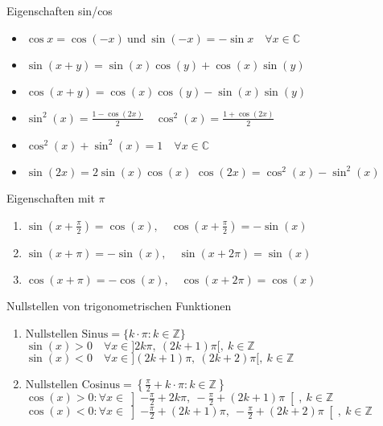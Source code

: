 \begin{theorem}{Eigenschaften sin/cos}
    \begin{itemize}
        \item $\cos x = \cos(-x) ~\text{und}~ \sin(-x) = -\sin x \quad\forall x \in \mathbb{C}$
        \item $\sin(x + y) = \sin(x)\cos(y) + \cos(x)\sin(y)$
        \item $\cos(x + y) = \cos(x)\cos(y) - \sin(x)\sin(y)$
        \item $\sin^2(x) = \frac{1 - \cos(2x)}{2} \quad \cos^2(x) = \frac{1 + \cos(2x)}{2}$
        \item $\cos^2(x) + \sin^2(x) = 1 \quad \forall x \in \mathbb{C}$ 
        \item $\sin(2x) = 2 \sin(x)\cos(x)$ \hspace{4mm} $\cos(2x) = \cos^2(x) - \sin^2(x)$
    \end{itemize} 
 \end{theorem}
 
 \begin{corollary}{Eigenschaften mit $\pi$}
     \begin{enumerate}[itemsep= 2pt]
         \item $\sin\left(x + \frac{\pi}{2}\right) = \cos(x), \quad \cos\left(x + \frac{\pi}{2}\right) = -\sin(x)$
         \item $\sin(x+\pi) = -\sin (x), \quad \sin(x + 2\pi) = \sin(x)$
         \item $\cos(x+\pi) = -\cos (x), \quad \cos(x + 2\pi) = \cos(x)$
     \end{enumerate}
 \end{corollary}

 \begin{corollary}{Nullstellen von trigonometrischen Funktionen}
    \begin{enumerate}
         \item $\text{Nullstellen Sinus} = \{k\cdot \pi : k\in \mathbb{Z}\}$\\
        $\sin(x) > 0 \quad \forall x \in ]2k\pi, ~(2k+1)\pi[, ~ k\in \mathbb{Z}$\\[2pt]
        $\sin(x) < 0 \quad \forall x \in ](2k + 1)\pi, ~(2k+2)\pi[, ~ k\in \mathbb{Z}$
        \item $\text{Nullstellen Cosinus} = \left\{\frac{\pi}{2}+k\cdot \pi : k\in \mathbb{Z}\right\}$\\
        $\cos(x) > 0:\forall x \in \left]-\frac{\pi}{2} +2k\pi, ~-\frac{\pi}{2} +(2k+1)\pi\right[, ~ k\in \mathbb{Z}$\\[2pt]
        $\cos(x) < 0:\forall x \in \left]-\frac{\pi}{2} + (2k + 1)\pi, ~-\frac{\pi}{2} +(2k+2)\pi\right[, ~ k\in \mathbb{Z}$
    \end{enumerate}
\end{corollary}
 



